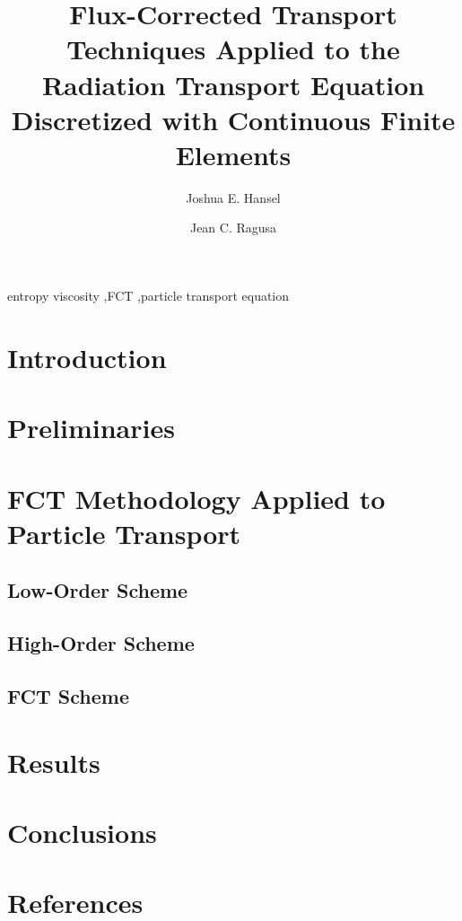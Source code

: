 \documentclass{elsarticle}
\newcommand{\tcr}[1]{\textcolor{red}{#1}}
\begin{document}
\begin{frontmatter}


\title{Flux-Corrected Transport Techniques Applied to the
	Radiation Transport Equation Discretized with Continuous Finite Elements}

\author[tamu]{Joshua E. Hansel}

\author[tamu]{Jean C. Ragusa}

\address[tamu]{Texas A\&M University,
  400 Bizzell St,
  College Station, TX 77840}



\begin{keyword}
entropy viscosity \sep FCT \sep particle transport equation
\end{keyword}

\end{frontmatter}

\section{Introduction\label{sec:introduction}}


\section{Preliminaries\label{sec:preliminaries}}


\section{FCT Methodology Applied to Particle Transport\label{sec:methodology}}

\subsection{Low-Order Scheme\label{sec:low}}

\subsection{High-Order Scheme\label{sec:high}}

\subsection{FCT Scheme\label{sec:fct}}


\section{Results\label{sec:results}}


\section{Conclusions\label{sec:conclusions}}


\section*{References}


\end{document}
